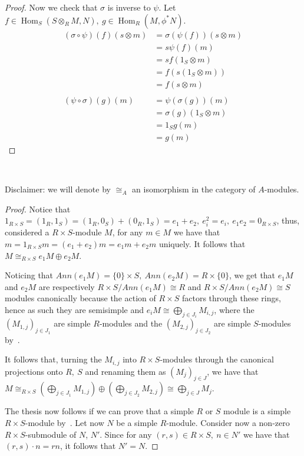 \documentclass{article}
\newcommand{\exercise}[1]{\noindent {\bf Exercise #1}}
\DeclareMathOperator{\Hom}{Hom}
\begin{document}
\begin{proof}
	Now we check that $\sigma$ is inverse to $\psi$. Let $f\in\Hom_S(S\otimes_R M,N),\ g\in\Hom_R(M,\phi^*N)$.
	\begin{align*}
		(\sigma\circ\psi)(f)(s\otimes m) &=\sigma(\psi(f))(s\otimes m) \\
		&=s\psi(f)(m) \\
		&=sf(1_S\otimes m) \\
		&=f(s(1_S\otimes m)) \\
		&=f(s\otimes m) \\
		\\
		(\psi\circ\sigma)(g)(m) &=\psi(\sigma(g))(m) \\
		&=\sigma(g)(1_S\otimes m) \\
		&=1_Sg(m) \\
		&=g(m)
	\end{align*}
\end{proof}

~\\
\exercise{6.12}
	
	Disclaimer: we will denote by $\cong_A$ an isomorphism in the category of $A$-modules.
	
\begin{proof}
	Notice that $1_{R\times S}=(1_R,1_S)=(1_R,0_S)+(0_R,1_S)=e_1+e_2,\ e_i^2=e_i,\ e_1e_2=0_{R\times S}$, thus, considered a $R\times S$-module $M$, for any $m\in M$ we have that $m=1_{R\times S} m=(e_1+e_2)m=e_1m+e_2m$ uniquely. It follows that $M\cong_{R\times S} e_1M\oplus e_2M$.
	
	Noticing that $Ann(e_1M)=\{0\}\times S,\ Ann(e_2M)=R\times\{0\}$, we get that $e_1M$ and $e_2M$ are respectively $R\times S/Ann(e_1M)\cong R$ and $R\times S/Ann(e_2M)\cong S$ modules canonically because the action of $R\times S$ factors through these rings, hence as such they are semisimple and $e_iM\cong \bigoplus_{j\in J_i} M_{i,j}$, where the $(M_{1,j})_{j\in J_1}$ are simple $R$-modules and the $(M_{2,j})_{j\in J_2}$ are simple $S$-modules by~\cite[thm. 9.2]{Tor10}.
	
	It follows that, turning the $M_{i,j}$ into $R\times S$-modules through the canonical projections onto $R,\ S$ and renaming them as $(M_j)_{j\in J}$, we have that $M\cong_{R\times S} (\bigoplus_{j\in J_1} M_{1,j})\oplus (\bigoplus_{j\in J_2} M_{2,j})\cong\bigoplus_{j\in J} M_j$.
	
	The thesis now follows if we can prove that a simple $R$ or $S$ module is a simple $R\times S$-module by~\cite[thm. 9.2]{Tor10}. Let now $N$ be a simple $R$-module. Consider now a non-zero $R\times S$-submodule of $N$, $N'$. Since for any $(r,s)\in R\times S,\ n\in N'$ we have that $(r,s)\cdot n=rn$, it follows that $N'=N$.
\end{proof}

\printbibliography
\end{document}
